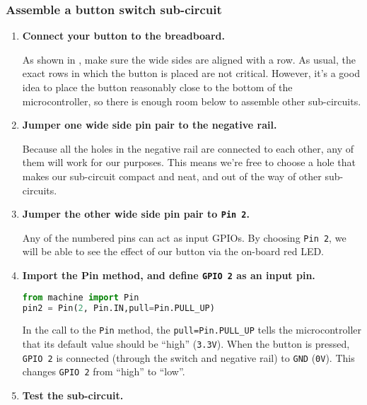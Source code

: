 \subsubsection{\howto Assemble a button switch sub-circuit}
\begin{enumerate}
	\item  \textbf{Connect your button to the breadboard.}
	
	As shown in , make sure the wide sides are aligned with a row. As usual, the exact rows in which the button is placed are not critical. However, it's a good idea to place the button reasonably close to the bottom of the microcontroller, so there is enough room below to assemble other sub-circuits.
	
	\item  \textbf{Jumper one wide side pin pair to the negative rail.}
	
	Because all the holes in the negative rail are connected to each other, any of them will work for our purposes. This means we're free to choose a hole that makes our sub-circuit compact and neat, and out of the way of other sub-circuits. 

	\item  \textbf{Jumper the other wide side pin pair to \texttt{Pin 2}.}
	
	Any of the numbered pins can act as input GPIOs. By choosing \texttt{Pin 2}, we will be able to see the effect of our button via the on-board red LED.
	

	\item \textbf{Import the Pin method, and define \texttt{GPIO 2} as an input pin.}
\begin{lstlisting}[language=Python]
from machine import Pin 
pin2 = Pin(2, Pin.IN,pull=Pin.PULL_UP) 
\end{lstlisting}	
	In the call to the \texttt{Pin} method, the \texttt{pull=Pin.PULL\_UP} tells the microcontroller that its default value should be ``high'' (\texttt{3.3V}). When the button is pressed, \texttt{GPIO 2} is connected (through the switch and negative rail) to \texttt{GND} (\texttt{0V}). This changes \texttt{GPIO 2} from ``high'' to ``low''.

	\item \textbf{Test the sub-circuit.}
	

\end{enumerate}

